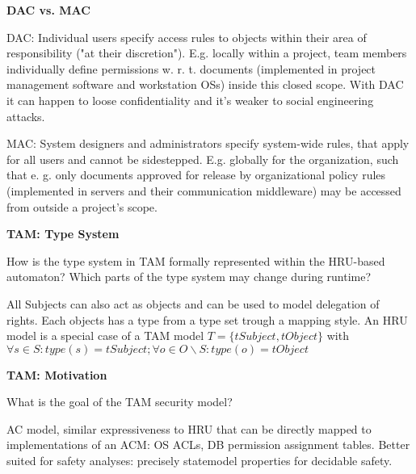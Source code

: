 \documentclass[10pt]{exam}  %
\begin{document}
\begin{questions}
    \question \textbf{DAC vs. MAC}\hfill
    \begin{solution}
        DAC: Individual users specify access rules to objects within their area of responsibility ("at their discretion"). E.g. locally within a project, team members individually define permissions w. r. t. documents (implemented in project management software and workstation OSs) inside this closed scope. With DAC it can happen to loose confidentiality and it's weaker to social engineering attacks.

MAC: System designers and administrators specify system-wide rules, that apply for all users and cannot be sidestepped. E.g. globally for the organization, such that e. g. only documents approved for release by organizational policy rules (implemented in servers and their communication middleware) may be accessed from outside a project’s scope.
    \end{solution}

    \question \textbf{TAM: Type System}\hfill

    How is the type system in TAM formally represented within the HRU-based automaton? Which parts of the type system may change during runtime?
    \begin{solution}
        All Subjects can also act as objects and can be used to model delegation of rights. Each objects has a type from a type set trough a mapping style. 
        An HRU model is a special case of a TAM model $T=\{tSubject,tObject\}$ with $\forall s\in S:type(s)=tSubject; \forall o\in O\backslash S:type(o)=tObject$
    \end{solution}

    \question \textbf{TAM: Motivation}\hfill

    What is the goal of the TAM security model?
    \begin{solution}
        AC model, similar expressiveness to HRU that can be directly mapped to implementations of an ACM: OS ACLs, DB permission assignment tables. Better suited for safety analyses: precisely statemodel properties for decidable safety.
    \end{solution}


\end{questions}
\end{document}
